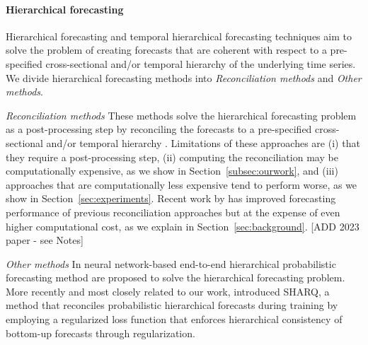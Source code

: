 \documentclass[preprint, 3p, times, twocolumn]{elsarticle}
\begin{document}
\paragraph{Hierarchical forecasting} Hierarchical forecasting \cite{hyndman_optimal_2011, hyndman_fast_2016, taieb_coherent_2017, bentaieb_regularized_2019, wickramasuriya_optimal_2019} and temporal hierarchical forecasting techniques \cite{taieb_sparse_2017,athanasopoulos_forecasting_2017,rangapuram_coherent_2023,theodosiou_forecasting_2021} aim to solve the problem of creating forecasts that are coherent with respect to a pre-specified cross-sectional and/or temporal hierarchy of the underlying time series. We divide hierarchical forecasting methods into \textit{Reconciliation methods} and \textit{Other methods}.

\textit{Reconciliation methods} These methods solve the hierarchical forecasting problem as a post-processing step by reconciling the forecasts to a pre-specified cross-sectional and/or temporal hierarchy \cite{hyndman_optimal_2011, hyndman_fast_2016, taieb_coherent_2017, bentaieb_regularized_2019, wickramasuriya_optimal_2019, panagiotelis_forecast_2021}. Limitations of these approaches are (i) that they require a post-processing step, (ii) computing the reconciliation may be computationally expensive, as we show in Section~\ref{subsec:ourwork}, and (iii) approaches that are computationally less expensive tend to perform worse, as we show in Section~\ref{sec:experiments}. Recent work by \citet{taieb_sparse_2017, bentaieb_regularized_2019} has improved forecasting performance of previous reconciliation approaches but at the expense of even higher computational cost, as we explain in Section~\ref{sec:background}. [ADD 2023 paper - see Notes]

\textit{Other methods} In \cite{rangapuram_endtoend_2021,rangapuram_coherent_2023} neural network-based end-to-end hierarchical probabilistic forecasting method are proposed to solve the hierarchical forecasting problem. More recently and most closely related to our work, \citet{han_simultaneously_2021} introduced SHARQ, a method that reconciles probabilistic hierarchical forecasts during training by employing a regularized loss function that enforces hierarchical consistency of bottom-up forecasts through regularization.
\end{document}
